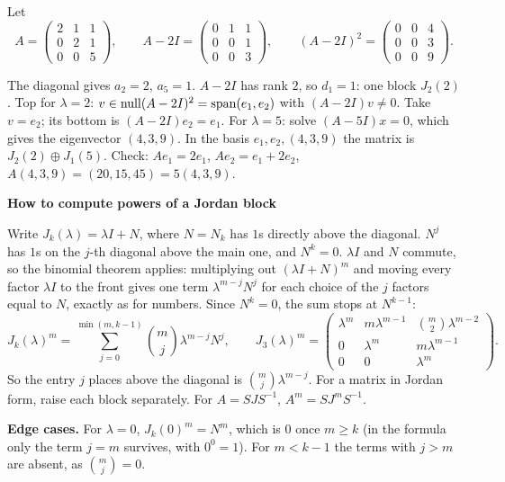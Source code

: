 \documentclass[10pt]{scrartcl}
\newenvironment{methodbox}[1]{\begin{mdframed}[style=mdbluebox,linecolor=NavyBlue,backgroundcolor=NavyBlue!3]\textbf{\color{NavyBlue}#1}\par\vspace{2pt}}{\end{mdframed}}
\begin{document}
\begin{example*}
  Let
  \[ A=\begin{pmatrix}2&1&1\\0&2&1\\0&0&5\end{pmatrix},\qquad A-2I=\begin{pmatrix}0&1&1\\0&0&1\\0&0&3\end{pmatrix},\qquad (A-2I)^2=\begin{pmatrix}0&0&4\\0&0&3\\0&0&9\end{pmatrix}. \]
  \begin{steps}
    \ii The diagonal gives $a_2=2$, $a_5=1$. $A-2I$ has rank $2$, so $d_1=1$: one block $J_2(2)$.
    \ii Top for $\lambda=2$: $v\in\operatorname{null}(A-2I)^2=\operatorname{span}(e_1,e_2)$ with $(A-2I)v\ne0$. Take $v=e_2$; its bottom is $(A-2I)e_2=e_1$.
    \ii For $\lambda=5$: solve $(A-5I)x=0$, which gives the eigenvector $(4,3,9)$.
    \ii In the basis $e_1,e_2,(4,3,9)$ the matrix is $J_2(2)\oplus J_1(5)$. Check: $Ae_1=2e_1$, $Ae_2=e_1+2e_2$, $A(4,3,9)=(20,15,45)=5(4,3,9)$.
  \end{steps}
\end{example*}

\begin{methodbox}{How to compute powers of a Jordan block}
\begin{enumerate}[label=\arabic*.,leftmargin=1.5em,itemsep=2pt,topsep=2pt]
  \ii Write $J_k(\lambda)=\lambda I+N$, where $N=N_k$ has $1$s directly above the diagonal. $N^j$ has $1$s on the $j$-th diagonal above the main one, and $N^k=0$.
  \ii $\lambda I$ and $N$ commute, so the binomial theorem applies: multiplying out $(\lambda I+N)^m$ and moving every factor $\lambda I$ to the front gives one term $\lambda^{m-j}N^j$ for each choice of the $j$ factors equal to $N$, exactly as for numbers. Since $N^k=0$, the sum stops at $N^{k-1}$:
  \[ J_k(\lambda)^m=\sum_{j=0}^{\min(m,k-1)}\binom mj\lambda^{m-j}N^j,\qquad J_3(\lambda)^m=\begin{pmatrix}\lambda^m&m\lambda^{m-1}&\binom m2\lambda^{m-2}\\0&\lambda^m&m\lambda^{m-1}\\0&0&\lambda^m\end{pmatrix}. \]
  \ii So the entry $j$ places above the diagonal is $\binom mj\lambda^{m-j}$.
  \ii For a matrix in Jordan form, raise each block separately. For $A=SJS^{-1}$, $A^m=SJ^mS^{-1}$.
\end{enumerate}
\textbf{Edge cases.} For $\lambda=0$, $J_k(0)^m=N^m$, which is $0$ once $m\ge k$ (in the formula only the term $j=m$ survives, with $0^0=1$). For $m<k-1$ the terms with $j>m$ are absent, as $\binom mj=0$.
\end{methodbox}
\end{document}
